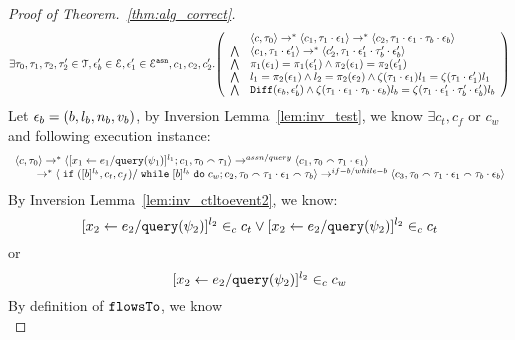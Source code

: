 \begin{proof}[Proof of Theorem.~\ref{thm:alg_correct}]
\[
\exists \vtrace_0,
\vtrace_1, \vtrace_2, \vtrace_2' \in \mathcal{T}, \event_b' \in \eventset, \event_1' \in \eventset^{\asn}, 
{c}_1, {c}_2,  {c}_2'.
  \left(
  \begin{array}{ll}   
 & \config{{c}, \vtrace_0} \rightarrow^{*} 
\config{{c}_1, \vtrace_1 \cdot \event_1}  \rightarrow^{*} 
  \config{{c}_2,  \vtrace_1 \cdot \event_1 \cdot \vtrace_b \cdot \event_b } 
 \\ 
 \bigwedge &
  \config{{c}_1, \vtrace_1 \cdot \event_1'}  \rightarrow^{*} 
  \config{{c}_2',  \vtrace_1 \cdot \event_1' \cdot \vtrace_b' \cdot \event_b' } 
\\
\bigwedge &  \pi_1(\event_1) = \pi_1(\event_1') \land \pi_2(\event_1) = \pi_2(\event_1') \\
\bigwedge & l_1 = \pi_2(\event_1) \land l_2 = \pi_2(\event_2)
\land \vcounter(\vtrace_1 \cdot \event_1) l_1 = \vcounter(\vtrace_1 \cdot \event_1')l_1 
\\
\bigwedge & 
\diff(\event_b,\event_b' ) \land 
\vcounter(\vtrace_1 \cdot \event_1 \cdot \vtrace_b \cdot \event_b) l_b
= 
\vcounter(\vtrace_1 \cdot \event_1' \cdot \vtrace_b'\cdot \event_b') l_b\\
\end{array}
\right)
 \]
%
 Let $\mathtt{\epsilon}_b = (b, l_b, n_b, v_b)$, by {Inversion Lemma~\ref{lem:inv_test}},
we know $\exists  c_t, c_f$ or $c_w$ and following execution instance:
\begin{equation}
\label{eq:ctldep_inv1}
  \begin{array}{l}   
\langle {c}, \mathtt{\tau}_0 \rangle \rightarrow^{*} 
\langle [\mathrel{ {x}_1 \leftarrow e_1 / {\tt query}(\psi_1) }]^{l_1} ; {c}_1, \mathtt{\tau}_0 \smallfrown \mathtt{\tau}_1 \rangle  
\rightarrow^{assn/query}
 \langle c_1, \mathtt{\tau}_0 \smallfrown \mathtt{\tau}_1 \cdot \mathtt{\epsilon}_1 \rangle 
 \\ \qquad 
 \rightarrow^{*} 
  \langle \;\mathtt{if}\;([b]{}^{l_b}, c_t, c_f) / \;\mathtt{while}\; [b]{}^{l_b} \;\mathtt{do}\; c_w; {c}_2, 
  \mathtt{\tau}_0 \smallfrown \mathtt{\tau}_1 \cdot \mathtt{\epsilon}_1 \smallfrown \mathtt{\tau}_b \rangle 
  \rightarrow^{if-b / while-b} 
  \langle {c}_3,  \mathtt{\tau}_0 \smallfrown \mathtt{\tau}_1 \cdot \mathtt{\epsilon}_1 \smallfrown \mathtt{\tau}_b \cdot \mathtt{\epsilon}_b \rangle 
\end{array}
\end{equation}
%
By Inversion Lemma~\ref{lem:inv_ctltoevent2}, we know:
\[
  [\mathrel{ {x}_2 \leftarrow e_2 / {\tt query}(\psi_2) }]^{l_2} \in_c c_t
  \lor
  [\mathrel{ {x}_2 \leftarrow e_2 / {\tt query}(\psi_2) }]^{l_2} \in_c c_t
\]
or
\[
    [\mathrel{ {x}_2 \leftarrow e_2 / {\tt query}(\psi_2) }]^{l_2} \in_c c_w
\]
%
By definition of $\mathtt{flowsTo}$, we know
\begin{equation}

\end{equation}
\end{proof}
